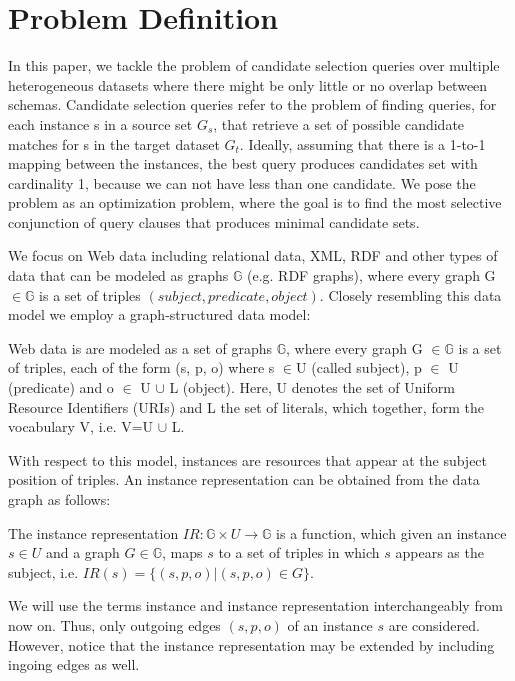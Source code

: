 \section{Problem Definition}
In this paper, we tackle the problem of candidate selection queries over multiple heterogeneous datasets where there might be only little or no overlap between schemas. Candidate selection queries refer to the problem of finding queries, for each instance s in a source set $G_s$, that retrieve a set of possible candidate matches for s in the target dataset $G_t$.  Ideally, assuming that there is a 1-to-1 mapping between the instances, the best query produces candidates set with cardinality 1, because we can not have less than one candidate. We pose the problem as an optimization problem, where the goal is to find the most selective conjunction of query clauses that produces minimal candidate sets.

We focus on Web data including relational data, XML, RDF and other types of data that can be modeled as graphs $\mathbb{G}$ (e.g. RDF graphs),  where every graph G $\in\mathbb{G}$ is a set of triples $(subject, predicate, object)$.  Closely resembling this data model we employ a graph-structured data model: 

\begin{definition} Web data is are modeled as a set of graphs $\mathbb{G}$, where every graph G $\in\mathbb{G}$ is a set of triples, each of the form (s, p, o) where s $\in$U (called subject), p $\in$ U (predicate) and o $\in$ U $\cup$ L (object). Here, U denotes the set of Uniform Resource Identifiers (URIs) and L the set of literals, which together, form the vocabulary V, i.e. V=U $\cup$ L.  
\end{definition} 

With respect to this model, instances are resources that appear at the subject position of triples. An instance representation can be obtained from the data graph as follows:

\begin{definition} The instance representation $IR: \mathbb{G} \times U \rightarrow \mathbb{G}$ is a function, which given an instance $s \in U$ and a graph $G \in \mathbb{G}$, maps $s$ to a set of triples in which $s$ appears as the subject, i.e. $IR(s) = \{ (s, p, o) | (s, p, o) \in G \}$. 
\end{definition} 

We will use the terms instance and instance representation interchangeably from now on. Thus, only outgoing edges $(s, p, o)$ of an instance $s$ are considered. However, notice that the instance representation may be extended by including ingoing edges as well.

